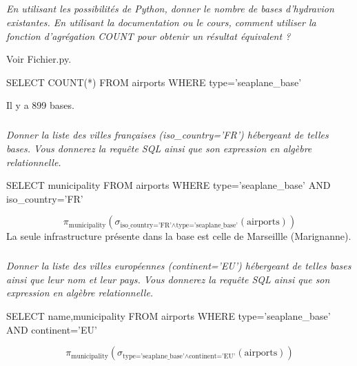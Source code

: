 \documentclass[10pt,fleqn]{article} %
\begin{document}
\subparagraph{}
\textit{En utilisant les possibilités de Python, donner le nombre de bases d'hydravion existantes. En utilisant la documentation ou le cours, comment utiliser la fonction d'agrégation COUNT pour obtenir un résultat équivalent ?}
\ifprof
\begin{corrige}
Voir Fichier.py.
\begin{envsql}
\begin{sql}
SELECT COUNT(*) FROM airports WHERE type='seaplane_base'
\end{sql}
\end{envsql}

Il y a 899 bases. 

\end{corrige}
\else
\fi

\subparagraph{}
\textit{Donner la liste des villes françaises (\textsl{iso\_country='FR'}) hébergeant de telles bases. Vous donnerez la requête SQL ainsi que son expression en algèbre relationnelle.}
\ifprof
\begin{corrige}
\begin{envsql}
\begin{sql}
SELECT municipality FROM airports WHERE type='seaplane_base' AND iso_country='FR'
\end{sql}
\end{envsql}
$$
\pi_{\text{municipality}}\left(\sigma_{\text{iso\_country='FR'} \wedge \text{type='seaplane\_base'} }\left(\text{airports}\right)\right)
$$
La seule infrastructure présente dans la base est celle de Marseillle (Marignanne).
\end{corrige}
\else
\fi



\subparagraph{}
\textit{Donner la liste des villes européennes (\textsl{continent='EU'}) hébergeant de telles bases ainsi que leur nom et leur pays. Vous donnerez la requête SQL ainsi que son expression en algèbre relationnelle.}%
\ifprof
\begin{corrige}
\begin{envsql}
\begin{sql}
SELECT name,municipality FROM airports WHERE type='seaplane_base' AND continent='EU'
\end{sql}
\end{envsql}
$$
\pi_{\text{municipality}}\left(\sigma_{\text{type='seaplane\_base'} \wedge \text{continent='EU'} }\left(\text{airports}\right)\right)
$$
\end{corrige}\else
\fi
\end{document}
